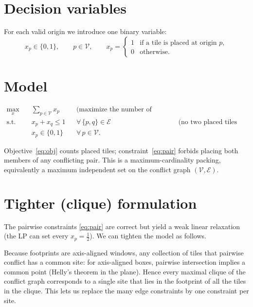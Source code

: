 \documentclass[11pt]{article}
\newcommand{\Vset}{\mathcal{V}}
\newcommand{\Eset}{\mathcal{E}}
\begin{document}
\section{Decision variables}
For each valid origin we introduce one binary variable:
\[
  x_p \in \{0,1\}, \qquad p \in \Vset,
  \qquad
  x_p =
  \begin{cases}
    1 & \text{if a tile is placed at origin } p,\\
    0 & \text{otherwise.}
  \end{cases}
\]

\section{Model}

\begin{align}
  \max_{x} \quad & \sum_{p \in \Vset} x_p
    && \text{(maximize the number of placed tiles)} \label{eq:obj}\\[4pt]
  \text{s.t.} \quad
    & x_p + x_q \le 1
    && \forall\, \{p,q\} \in \Eset
    && \text{(no two placed tiles overlap)} \label{eq:pair}\\[2pt]
    & x_p \in \{0,1\}
    && \forall\, p \in \Vset. && \label{eq:bin}
\end{align}

Objective~\eqref{eq:obj} counts placed tiles; constraint~\eqref{eq:pair} forbids placing
both members of any conflicting pair. This is a maximum-cardinality packing, equivalently a
maximum independent set on the conflict graph $(\Vset, \Eset)$.

\section{Tighter (clique) formulation}

The pairwise constraints \eqref{eq:pair} are correct but yield a weak linear relaxation
(the LP can set every $x_p = \tfrac12$). We can tighten the model as follows.

Because footprints are axis-aligned windows, any collection of tiles that pairwise conflict
has a common site: for axis-aligned boxes, pairwise intersection implies a common point
(Helly's theorem in the plane). Hence every maximal clique of the conflict graph corresponds
to a single site that lies in the footprint of all the tiles in the clique. This lets us
replace the many edge constraints by one constraint per site.
\end{document}
